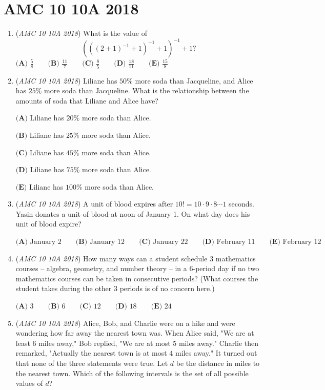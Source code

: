 \section{AMC 10 10A 2018}
        \begin{enumerate}
        	\item (\textit{AMC 10 10A 2018}) What is the value of 
 \[\left(\left((2+1)^{-1}+1\right)^{-1}+1\right)^{-1}+1?\]$\textbf{(A) } \frac58 \qquad \textbf{(B) }\frac{11}7 \qquad \textbf{(C) } \frac85 \qquad \textbf{(D) } \frac{18}{11} \qquad \textbf{(E) } \frac{15}8$


	\item (\textit{AMC 10 10A 2018}) Liliane has $50\%$ more soda than Jacqueline, and Alice has $25\%$ more soda than Jacqueline. What is the relationship between the amounts of soda that Liliane and Alice have?


 $\textbf{(A)}$  Liliane has $20\%$ more soda than Alice. 


 $\textbf{(B)}$  Liliane has $25\%$ more soda than Alice. 


 $\textbf{(C)}$  Liliane has $45\%$ more soda than Alice. 


 $\textbf{(D)}$  Liliane has $75\%$ more soda than Alice.


 $\textbf{(E)}$  Liliane has $100\%$ more soda than Alice.


 

	\item (\textit{AMC 10 10A 2018}) A unit of blood expires after $10!=10\cdot 9 \cdot 8 \cdots 1$ seconds. Yasin donates a unit of blood at noon of January 1. On what day does his unit of blood expire?


 $\textbf{(A) }\text{January 2}\qquad\textbf{(B) }\text{January 12}\qquad\textbf{(C) }\text{January 22}\qquad\textbf{(D) }\text{February 11}\qquad\textbf{(E) }\text{February 12}$


	\item (\textit{AMC 10 10A 2018}) How many ways can a student schedule $3$ mathematics courses -- algebra, geometry, and number theory -- in a $6$-period day if no two mathematics courses can be taken in consecutive periods? (What courses the student takes during the other $3$ periods is of no concern here.)


 $\textbf{(A) }3\qquad\textbf{(B) }6\qquad\textbf{(C) }12\qquad\textbf{(D) }18\qquad\textbf{(E) }24$


	\item (\textit{AMC 10 10A 2018}) Alice, Bob, and Charlie were on a hike and were wondering how far away the nearest town was. When Alice said, "We are at least $6$ miles away," Bob replied, "We are at most $5$ miles away." Charlie then remarked, "Actually the nearest town is at most $4$ miles away." It turned out that none of the three statements were true. Let $d$ be the distance in miles to the nearest town. Which of the following intervals is the set of all possible values of $d$?



\end{enumerate}
